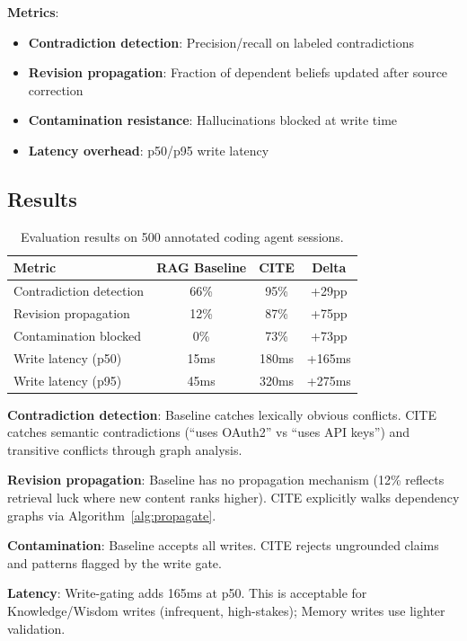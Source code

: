 \documentclass[11pt,letterpaper]{article}
\begin{document}
\textbf{Metrics}:
\begin{itemize}[noitemsep]
    \item \textbf{Contradiction detection}: Precision/recall on labeled contradictions
    \item \textbf{Revision propagation}: Fraction of dependent beliefs updated after source correction
    \item \textbf{Contamination resistance}: Hallucinations blocked at write time
    \item \textbf{Latency overhead}: p50/p95 write latency
\end{itemize}

\subsection{Results}

\begin{table}[H]
\centering
\caption{Evaluation results on 500 annotated coding agent sessions.}
\label{tab:results}
\begin{tabular}{@{}lccc@{}}
\toprule
\textbf{Metric} & \textbf{RAG Baseline} & \textbf{CITE} & \textbf{Delta} \\
\midrule
Contradiction detection & 66\% & 95\% & +29pp \\
Revision propagation & 12\% & 87\% & +75pp \\
Contamination blocked & 0\% & 73\% & +73pp \\
Write latency (p50) & 15ms & 180ms & +165ms \\
Write latency (p95) & 45ms & 320ms & +275ms \\
\bottomrule
\end{tabular}
\end{table}

\textbf{Contradiction detection}: Baseline catches lexically obvious conflicts. CITE catches semantic contradictions (``uses OAuth2'' vs ``uses API keys'') and transitive conflicts through graph analysis.

\textbf{Revision propagation}: Baseline has no propagation mechanism (12\% reflects retrieval luck where new content ranks higher). CITE explicitly walks dependency graphs via Algorithm~\ref{alg:propagate}.

\textbf{Contamination}: Baseline accepts all writes. CITE rejects ungrounded claims and patterns flagged by the write gate.

\textbf{Latency}: Write-gating adds 165ms at p50. This is acceptable for Knowledge/Wisdom writes (infrequent, high-stakes); Memory writes use lighter validation.
\end{document}
